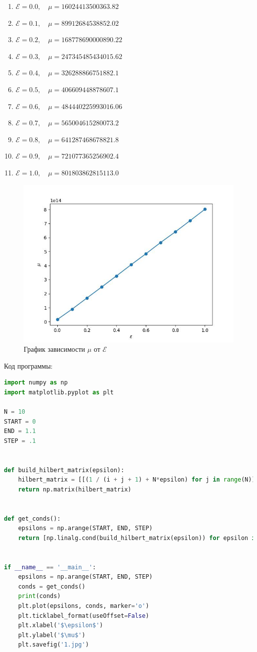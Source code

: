 \documentclass[a4paper, 14pt]{extarticle}
\begin{document}
		\begin{enumerate}
			\item $\mathcal{E}  = 0.0, \quad \mu = 16024413500363.82$
			\item $\mathcal{E}  = 0.1, \quad \mu = 89912684538852.02$
			\item $\mathcal{E}  = 0.2, \quad \mu = 168778690000890.22$
			\item $\mathcal{E}  = 0.3, \quad \mu = 247345485434015.62$
			\item $\mathcal{E}  = 0.4, \quad \mu = 326288866751882.1$
			\item $\mathcal{E}  = 0.5, \quad \mu = 406609448878607.1$
			\item $\mathcal{E}  = 0.6, \quad \mu = 484440225993016.06$
			\item $\mathcal{E}  = 0.7, \quad \mu = 565004615280073.2$
			\item $\mathcal{E}  = 0.8, \quad \mu = 641287468678821.8$
			\item $\mathcal{E}  = 0.9, \quad \mu = 721077365256902.4$
			\item $\mathcal{E}  = 1.0, \quad \mu = 801803862815113.0$
		\end{enumerate}
		\begin{figure}[H]
			\centering
			\includegraphics[width = .9\linewidth]{1.jpg}
			\caption[.] {График зависимости $\mu$ от $\mathcal{E}$} 
		\end{figure}
		\pagebreak
		Код программы:
		\begin{lstlisting}[language=Python]
import numpy as np
import matplotlib.pyplot as plt

N = 10
START = 0
END = 1.1
STEP = .1


def build_hilbert_matrix(epsilon):
	hilbert_matrix = [[(1 / (i + j + 1) + N*epsilon) for j in range(N)] for i in range(N)]
	return np.matrix(hilbert_matrix)


def get_conds():
	epsilons = np.arange(START, END, STEP)
	return [np.linalg.cond(build_hilbert_matrix(epsilon)) for epsilon in epsilons]


if __name__ == '__main__':
	epsilons = np.arange(START, END, STEP)
	conds = get_conds()
	print(conds)
	plt.plot(epsilons, conds, marker='o')
	plt.ticklabel_format(useOffset=False)
	plt.xlabel('$\epsilon$')
	plt.ylabel('$\mu$')
	plt.savefig('1.jpg')
		\end{lstlisting}
	
\end{document}
